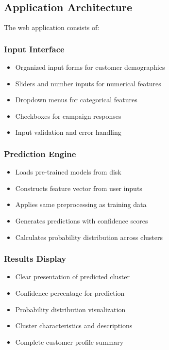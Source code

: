 \documentclass[12pt,a4paper]{report}
\begin{document}
\subsection{Application Architecture}
\noindent The web application consists of:

\subsubsection{Input Interface}
\begin{itemize}
    \item Organized input forms for customer demographics
    \item Sliders and number inputs for numerical features
    \item Dropdown menus for categorical features
    \item Checkboxes for campaign responses
    \item Input validation and error handling
\end{itemize}

\subsubsection{Prediction Engine}
\begin{itemize}
    \item Loads pre-trained models from disk
    \item Constructs feature vector from user inputs
    \item Applies same preprocessing as training data
    \item Generates predictions with confidence scores
    \item Calculates probability distribution across clusters
\end{itemize}

\subsubsection{Results Display}
\begin{itemize}
    \item Clear presentation of predicted cluster
    \item Confidence percentage for prediction
    \item Probability distribution visualization
    \item Cluster characteristics and descriptions
    \item Complete customer profile summary
\end{itemize}
\end{document}
